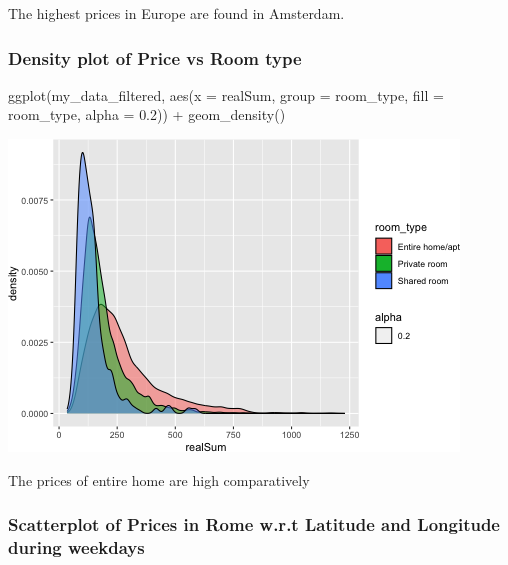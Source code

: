 \documentclass[
]{article}
\newenvironment{Shaded}{\begin{snugshade}}{\end{snugshade}}
\newcommand{\AttributeTok}[1]{\textcolor[rgb]{0.77,0.63,0.00}{#1}}
\newcommand{\FloatTok}[1]{\textcolor[rgb]{0.00,0.00,0.81}{#1}}
\newcommand{\FunctionTok}[1]{\textcolor[rgb]{0.00,0.00,0.00}{#1}}
\newcommand{\NormalTok}[1]{#1}
\newcommand{\SpecialCharTok}[1]{\textcolor[rgb]{0.00,0.00,0.00}{#1}}
\begin{document}
The highest prices in Europe are found in Amsterdam.

\hypertarget{density-plot-of-price-vs-room-type}{%
\subsubsection{Density plot of Price vs Room
type}\label{density-plot-of-price-vs-room-type}}

\begin{Shaded}
\begin{Highlighting}[]
\FunctionTok{ggplot}\NormalTok{(my\_data\_filtered, }\FunctionTok{aes}\NormalTok{(}\AttributeTok{x =}\NormalTok{ realSum, }\AttributeTok{group =}\NormalTok{ room\_type,}
    \AttributeTok{fill =}\NormalTok{ room\_type, }\AttributeTok{alpha =} \FloatTok{0.2}\NormalTok{)) }\SpecialCharTok{+} \FunctionTok{geom\_density}\NormalTok{()}
\end{Highlighting}
\end{Shaded}

\includegraphics{Project_files/figure-latex/unnamed-chunk-29-1.png}

The prices of entire home are high comparatively

\hypertarget{scatterplot-of-prices-in-rome-w.r.t-latitude-and-longitude-during-weekdays}{%
\subsubsection{Scatterplot of Prices in Rome w.r.t Latitude and
Longitude during
weekdays}\label{scatterplot-of-prices-in-rome-w.r.t-latitude-and-longitude-during-weekdays}}
\end{document}
